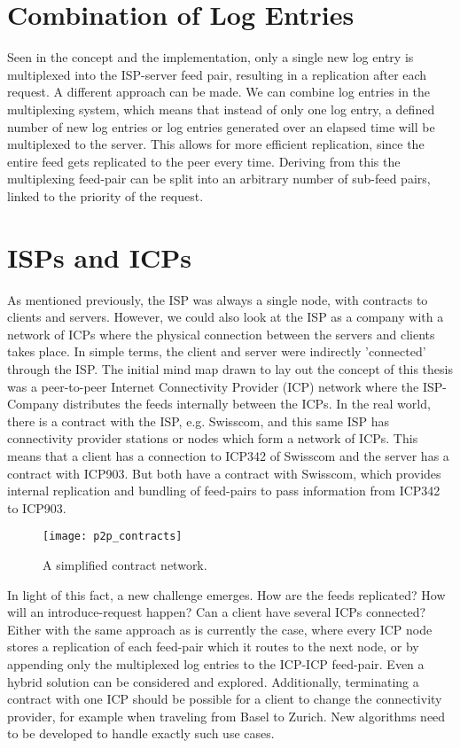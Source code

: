\section{Combination of Log Entries}
Seen in the concept and the implementation, only a single new log entry is multiplexed into the ISP-server feed pair, resulting in a replication after each request. A different approach can be made. We can combine log entries in the multiplexing system, which means that instead of only one log entry, a defined number of new log entries or log entries generated over an elapsed time will be multiplexed to the server. This allows for more efficient replication, since the entire feed gets replicated to the peer every time. Deriving from this the multiplexing feed-pair can be split into an arbitrary number of sub-feed pairs, linked to the priority of the request.
\section{ISPs and ICPs}
As mentioned previously, the ISP was always a single node, with contracts to clients and servers. However, we could also look at the ISP as a company with a network of ICPs where the physical connection between the servers and clients takes place. In simple terms, the client and server were indirectly ’connected’ through the ISP. The initial mind map drawn to lay out the concept of this thesis was a peer-to-peer Internet Connectivity Provider (ICP) network where the ISP-Company distributes the feeds internally between the ICPs. In the real world, there is a contract with the ISP, e.g. Swisscom, and this same ISP has connectivity provider stations or nodes which form a network of ICPs. This means that a client has a connection to ICP342 of Swisscom and the server has a contract with ICP903. But both have a contract with Swisscom, which provides internal replication and bundling of feed-pairs to pass information from ICP342 to ICP903. 
\begin{figure}
    \centering
    \texttt{[image: p2p\_contracts]}
    \caption{A simplified contract network.}
    \label{fig:contract_network}
\end{figure}
In light of this fact, a new challenge emerges. How are the feeds replicated? How will an introduce-request happen? Can a client have several ICPs connected? Either with the same approach as is currently the case, where every ICP node stores a replication of each feed-pair which it routes to the next node, or by appending only the multiplexed log entries to the ICP-ICP feed-pair. Even a hybrid solution can be considered and explored. Additionally, terminating a contract with one ICP should be possible for a client to change the connectivity provider, for example when traveling from Basel to Zurich. New algorithms need to be developed to handle exactly such use cases.

